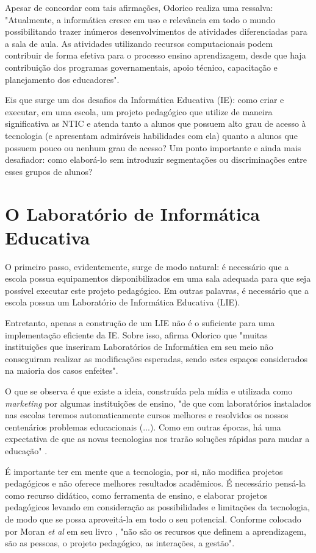 Apesar de concordar com tais afirmações, Odorico \cite{art:REF_ART_ODORICO} realiza uma ressalva: "Atualmente, a informática cresce em uso e relevância em todo o mundo possibilitando trazer inúmeros desenvolvimentos de atividades diferenciadas para a sala de aula. As atividades utilizando recursos computacionais podem contribuir de forma efetiva para o processo ensino aprendizagem, desde que haja contribuição dos programas governamentais, apoio técnico, capacitação e planejamento dos educadores".

Eis que surge um dos desafios da Informática Educativa (IE): como criar e executar, em uma escola, um projeto pedagógico que utilize de maneira significativa as NTIC e atenda tanto a alunos que possuem alto grau de acesso à tecnologia (e apresentam admiráveis habilidades com ela) quanto a alunos que possuem pouco ou nenhum grau de acesso? Um ponto importante e ainda mais desafiador: como elaborá-lo sem introduzir segmentações ou discriminações entre esses grupos de alunos?

\section{O Laboratório de Informática Educativa}\label{sec:LABEL_CHP_REF_TEO_SEC_LIE}

O primeiro passo, evidentemente, surge de modo natural: é necessário que a escola possua equipamentos disponibilizados em uma sala adequada para que seja possível executar este projeto pedagógico. Em outras palavras, é necessário que a escola possua um Laboratório de Informática Educativa (LIE).

Entretanto, apenas a construção de um LIE não é o suficiente para uma implementação eficiente da IE. Sobre isso, afirma Odorico \cite{art:REF_ART_ODORICO} que "muitas instituições que inseriram Laboratórios de Informática em seu meio não conseguiram realizar as modificações esperadas, sendo estes espaços considerados na maioria dos casos enfeites".

O que se observa é que existe a ideia, construída pela mídia e utilizada como \textit{marketing} por algumas instituições de ensino, "de que com laboratórios instalados nas escolas teremos automaticamente cursos melhores e resolvidos os nossos centenários problemas educacionais (...). Como em outras épocas, há uma expectativa de que as novas tecnologias nos trarão soluções rápidas para mudar a educação" \cite{art:REF_LIVRO_MORAN}.

É importante ter em mente que a tecnologia, por si, não modifica projetos pedagógicos e não oferece melhores resultados acadêmicos. É necessário pensá-la como recurso didático, como ferramenta de ensino, e elaborar projetos pedagógicos levando em consideração as possibilidades e limitações da tecnologia, de modo que se possa aproveitá-la em todo o seu potencial. Conforme colocado por Moran \textit{et al} em seu livro \cite{art:REF_LIVRO_MORAN}, "não são os recursos que definem a aprendizagem, são as pessoas, o projeto pedagógico, as interações, a gestão".

